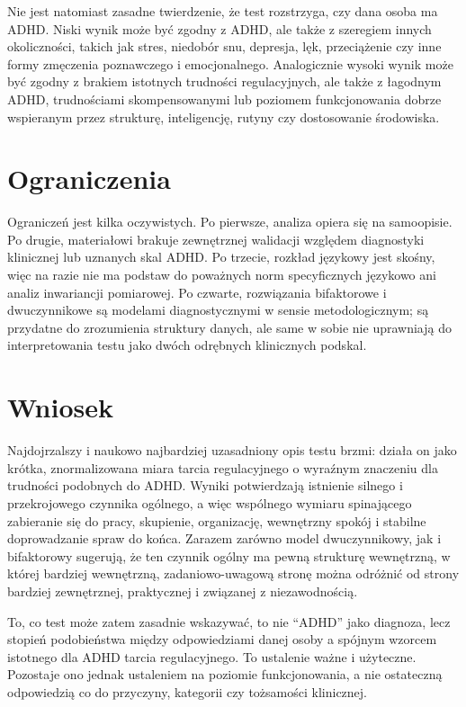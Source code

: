 \documentclass[11pt,a4paper]{article}
\begin{document}
Nie jest natomiast zasadne twierdzenie, że test rozstrzyga, czy dana osoba ma ADHD. Niski wynik może być zgodny z ADHD, ale także z szeregiem innych okoliczności, takich jak stres, niedobór snu, depresja, lęk, przeciążenie czy inne formy zmęczenia poznawczego i emocjonalnego. Analogicznie wysoki wynik może być zgodny z brakiem istotnych trudności regulacyjnych, ale także z łagodnym ADHD, trudnościami skompensowanymi lub poziomem funkcjonowania dobrze wspieranym przez strukturę, inteligencję, rutyny czy dostosowanie środowiska.

\section{Ograniczenia}
Ograniczeń jest kilka oczywistych. Po pierwsze, analiza opiera się na samoopisie. Po drugie, materiałowi brakuje zewnętrznej walidacji względem diagnostyki klinicznej lub uznanych skal ADHD. Po trzecie, rozkład językowy jest skośny, więc na razie nie ma podstaw do poważnych norm specyficznych językowo ani analiz inwariancji pomiarowej. Po czwarte, rozwiązania bifaktorowe i dwuczynnikowe są modelami diagnostycznymi w sensie metodologicznym; są przydatne do zrozumienia struktury danych, ale same w sobie nie uprawniają do interpretowania testu jako dwóch odrębnych klinicznych podskal.

\section{Wniosek}
Najdojrzalszy i naukowo najbardziej uzasadniony opis testu brzmi: działa on jako krótka, znormalizowana miara tarcia regulacyjnego o wyraźnym znaczeniu dla trudności podobnych do ADHD. Wyniki potwierdzają istnienie silnego i przekrojowego czynnika ogólnego, a więc wspólnego wymiaru spinającego zabieranie się do pracy, skupienie, organizację, wewnętrzny spokój i stabilne doprowadzanie spraw do końca. Zarazem zarówno model dwuczynnikowy, jak i bifaktorowy sugerują, że ten czynnik ogólny ma pewną strukturę wewnętrzną, w której bardziej wewnętrzną, zadaniowo-uwagową stronę można odróżnić od strony bardziej zewnętrznej, praktycznej i związanej z niezawodnością.

To, co test może zatem zasadnie wskazywać, to nie ``ADHD'' jako diagnoza, lecz stopień podobieństwa między odpowiedziami danej osoby a spójnym wzorcem istotnego dla ADHD tarcia regulacyjnego. To ustalenie ważne i użyteczne. Pozostaje ono jednak ustaleniem na poziomie funkcjonowania, a nie ostateczną odpowiedzią co do przyczyny, kategorii czy tożsamości klinicznej.

\printbibliography
\end{document}
